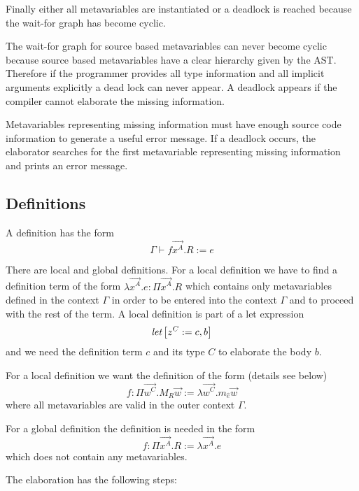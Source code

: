 Finally either all metavariables are instantiated or a deadlock is reached
because the wait-for graph has become cyclic.

The wait-for graph for source based metavariables can never become cyclic
because source based metavariables have a clear hierarchy given by the AST.
Therefore if the programmer provides all type information and all implicit
arguments explicitly a dead lock can never
appear. A deadlock appears if the compiler cannot elaborate the missing
information.

Metavariables representing missing information must have enough source code
information to generate a useful error message. If a deadlock occurs, the
elaborator searches for the first metavariable representing missing
information and prints an error message.






\subsection{Definitions}


A definition has the form
$$
    \Gamma \vdash f \vec {x^A}. R := e
$$

There are local and global definitions. For a local definition we have to find a
definition term of the form $\lambda \vec {x^A}. e: \Pi \vec{x^A}. R$ which
contains only metavariables defined in the context $\Gamma$ in order to be
entered into the context $\Gamma$ and to proceed with the rest of the term.
A local definition is part of a let expression
$$
    {{\text{\it let}} \left[ {z^C := c, b} \right]}
$$
and we need the definition term $c$ and its type $C$ to elaborate the body $b$.

For a local definition we want the definition of the form (details see below)
$$
    f
    :
    \Pi \vec {w^C}. M_R \vec w
    :=
    \lambda \vec{w^C}. m_{\hat e} \vec w
$$
where all metavariables are valid in the outer context $\Gamma$.

For a global definition the definition is needed in the form
$$
    f: \Pi \vec{x^A} . R := \lambda \vec {x^A}. e
$$
which does not contain any metavariables.



The elaboration has the following steps:

